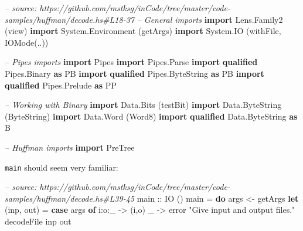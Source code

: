 \documentclass[]{article}
\newenvironment{Shaded}{\begin{snugshade}}{\end{snugshade}}
\newcommand{\CommentTok}[1]{\textcolor[rgb]{0.56,0.35,0.01}{\textit{#1}}}
\newcommand{\DataTypeTok}[1]{\textcolor[rgb]{0.13,0.29,0.53}{#1}}
\newcommand{\FunctionTok}[1]{\textcolor[rgb]{0.00,0.00,0.00}{#1}}
\newcommand{\KeywordTok}[1]{\textcolor[rgb]{0.13,0.29,0.53}{\textbf{#1}}}
\newcommand{\NormalTok}[1]{#1}
\newcommand{\OtherTok}[1]{\textcolor[rgb]{0.56,0.35,0.01}{#1}}
\newcommand{\StringTok}[1]{\textcolor[rgb]{0.31,0.60,0.02}{#1}}
\begin{document}
\begin{Shaded}
\begin{Highlighting}[]
\CommentTok{-- source: https://github.com/mstksg/inCode/tree/master/code-samples/huffman/decode.hs#L18-37}
\CommentTok{-- General imports}
\KeywordTok{import} \DataTypeTok{Lens.Family2}\NormalTok{       (view)}
\KeywordTok{import} \DataTypeTok{System.Environment}\NormalTok{ (getArgs)}
\KeywordTok{import} \DataTypeTok{System.IO}\NormalTok{          (withFile, }\DataTypeTok{IOMode}\NormalTok{(..))}

\CommentTok{-- Pipes imports}
\KeywordTok{import} \DataTypeTok{Pipes}
\KeywordTok{import} \DataTypeTok{Pipes.Parse}
\KeywordTok{import} \KeywordTok{qualified} \DataTypeTok{Pipes.Binary}     \KeywordTok{as} \DataTypeTok{PB}
\KeywordTok{import} \KeywordTok{qualified} \DataTypeTok{Pipes.ByteString} \KeywordTok{as} \DataTypeTok{PB}
\KeywordTok{import} \KeywordTok{qualified} \DataTypeTok{Pipes.Prelude}    \KeywordTok{as} \DataTypeTok{PP}

\CommentTok{-- Working with Binary}
\KeywordTok{import} \DataTypeTok{Data.Bits}\NormalTok{                 (testBit)}
\KeywordTok{import} \DataTypeTok{Data.ByteString}\NormalTok{           (}\DataTypeTok{ByteString}\NormalTok{)}
\KeywordTok{import} \DataTypeTok{Data.Word}\NormalTok{                 (}\DataTypeTok{Word8}\NormalTok{)}
\KeywordTok{import} \KeywordTok{qualified} \DataTypeTok{Data.ByteString} \KeywordTok{as} \DataTypeTok{B}

\CommentTok{-- Huffman imports}
\KeywordTok{import} \DataTypeTok{PreTree}
\end{Highlighting}
\end{Shaded}

\texttt{main} should seem very familiar:

\begin{Shaded}
\begin{Highlighting}[]
\CommentTok{-- source: https://github.com/mstksg/inCode/tree/master/code-samples/huffman/decode.hs#L39-45}
\OtherTok{main ::} \DataTypeTok{IO}\NormalTok{ ()}
\NormalTok{main }\FunctionTok{=} \KeywordTok{do}
\NormalTok{    args     }\OtherTok{<-}\NormalTok{ getArgs}
    \KeywordTok{let}\NormalTok{ (inp, out)  }\FunctionTok{=} \KeywordTok{case}\NormalTok{ args }\KeywordTok{of}
\NormalTok{                        i}\FunctionTok{:}\NormalTok{o}\FunctionTok{:}\NormalTok{_      }\OtherTok{->}\NormalTok{ (i,o)}
\NormalTok{                        _          }\OtherTok{->}\NormalTok{ error }\StringTok{"Give input and output files."}
\NormalTok{    decodeFile inp out}
\end{Highlighting}
\end{Shaded}
\end{document}
